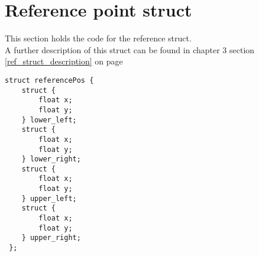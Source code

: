 \section{Reference point struct}
\label{ref_struct_code}
This section holds the code for the reference struct.\\
A further description of this struct can be found in chapter 3 section \ref{ref_struct_description} on page \pageref{ref_struct_description}
\begin{lstlisting}[caption={Reference point struct}]
 struct referencePos {
 	struct {
 		float x;
 		float y;
 	} lower_left;
 	struct {
 		float x;
 		float y;
 	} lower_right;
 	struct {
 		float x;
 		float y;
 	} upper_left;
 	struct {
		float x;
 		float y;
 	} upper_right;
 };
\end{lstlisting}

